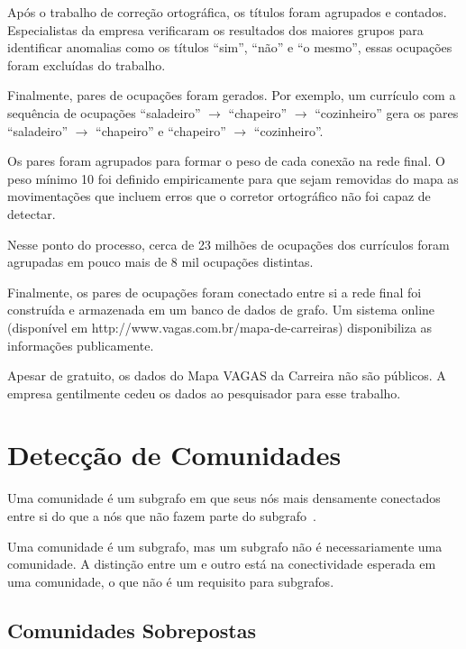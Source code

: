 \documentclass[
  article,
  11pt,
  a4paper,
  english,
  brazil,
  sumario=tradicional]{abntex2}
\begin{document}
Após o trabalho de correção ortográfica, os títulos foram agrupados e contados. Especialistas da empresa verificaram os resultados dos maiores grupos para identificar anomalias como os títulos \enquote{sim}, \enquote{não} e \enquote{o mesmo}, essas ocupações foram excluídas do trabalho.

Finalmente, pares de ocupações foram gerados. Por exemplo, um currículo com a sequência de ocupações \enquote{saladeiro} $\to$ \enquote{chapeiro} $\to$ \enquote{cozinheiro} gera os pares \enquote{saladeiro} $\to$ \enquote{chapeiro} e \enquote{chapeiro} $\to$ \enquote{cozinheiro}.

Os pares foram agrupados para formar o peso de cada conexão na rede final. O peso mínimo 10 foi definido empiricamente para que sejam removidas do mapa as movimentações que incluem erros que o corretor ortográfico não foi capaz de detectar.

Nesse ponto do processo, cerca de 23 milhões de ocupações dos currículos foram agrupadas em pouco mais de 8 mil ocupações distintas.

Finalmente, os pares de ocupações foram conectado entre si a rede final foi construída e armazenada em um banco de dados de grafo. Um sistema online (disponível em http://www.vagas.com.br/mapa-de-carreiras) disponibiliza as informações publicamente.

Apesar de gratuito, os dados do Mapa VAGAS da Carreira não são públicos. A empresa gentilmente cedeu os dados ao pesquisador para esse trabalho.

\section{Detecção de Comunidades}

Uma comunidade é um subgrafo em que seus nós mais densamente conectados entre si do que a nós que não fazem parte do subgrafo~\cite{Barabasi2016-rn,Ahn2010-uh}.

Uma comunidade é um subgrafo, mas um subgrafo não é necessariamente uma comunidade. A distinção entre um e outro está na conectividade esperada em uma comunidade, o que não é um requisito para subgrafos.

\subsection{Comunidades Sobrepostas} \label{sec:comunidades-sobrepostas}
\end{document}
